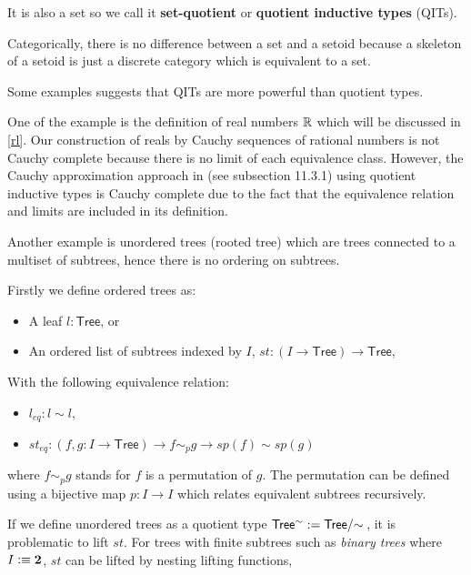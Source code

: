 It is also a set so we call it \textbf{set-quotient} or \textbf{quotient inductive types} (QITs).

\begin{remark}
Categorically, there is no difference between a set and a setoid because a skeleton of a setoid
is just a discrete category which is equivalent to a set.
\end{remark}

Some examples suggests that QITs are more powerful than quotient types.

One of the example is the definition of real numbers $\mathbb{R}$ which will be discussed in \autoref{rl}. Our construction of reals by Cauchy sequences of rational numbers is not Cauchy complete because there is no limit of each equivalence class. However, the Cauchy approximation approach in \cite{hott} (see subsection 11.3.1) using quotient inductive types is Cauchy complete due to the fact that the equivalence relation and limits are included in its definition.

Another example is unordered trees (rooted tree) which are trees connected to a multiset of subtrees, hence there is no ordering on subtrees.

Firstly we define ordered trees as:

\begin{itemize}
\item A leaf $l: \mathsf{Tree}$, or
\item An ordered list of subtrees indexed by $I$, $st : (I \rightarrow \mathsf{Tree}) \rightarrow \mathsf{Tree}$,
\end{itemize}

With the following equivalence relation:

\begin{itemize}
\item $l_{eq} : l \sim l$,
\item $st_{eq} : (f , g : I \to \mathsf{Tree}) \to f \sim_{p} g \to sp(f) \sim sp(g)$
\end{itemize}

where $f \sim_{p} g$ stands for $f$ is a permutation of $g$. The permutation can be defined using a bijective map $p : I \to I$ which relates equivalent subtrees recursively.


If we define unordered trees as a quotient type $\mathsf{Tree^{\sim}} := \qset{\mathsf{Tree}}$, 
it is problematic to lift $st$.
For trees with finite subtrees such as \emph{binary trees} where $I \vcentcolon\equiv \mathbf{2}$, $st$ can be lifted by nesting lifting functions,

